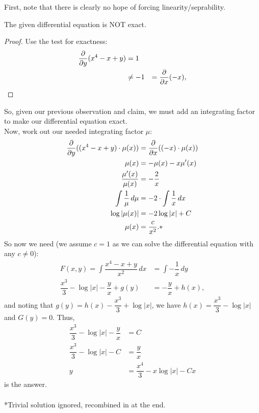 \documentclass{article}
\begin{document}
\begin{solution*}
    First, note that there is clearly no hope of forcing linearity/seprability.
    \begin{lemma}
        The given differential equation is NOT exact.
    \end{lemma}
    \begin{proof}
        Use the test for exactness:
        \begin{align*}
            \dfrac{\partial}{\partial y}(x^4 - x + y) &= 1 \\
            &\ne -1 &= \dfrac{\partial}{\partial x} (-x),
        \end{align*}
    \end{proof}
    So, given our previous observation and claim, we must add an integrating factor to make our differential equation exact. \\
    Now, work out our needed integrating factor $\mu$:
    \begin{align*}
        \dfrac{\partial}{\partial y}((x^4 - x + y) \cdot \mu(x)) &= \dfrac{\partial}{\partial x}((-x) \cdot \mu(x)) \\ 
        \mu(x) &= -\mu(x) - x \mu'(x) \\ 
        \dfrac{\mu'(x)}{\mu(x)} &= -\dfrac{2}{x} \\ 
        \int \dfrac{1}{\mu} \, d \mu &= -2 \cdot \int \dfrac{1}{x} \, dx \\ 
        \log |\mu(x)| &= -2\log |x| + C \\ 
        \mu(x) &= \dfrac{c}{x^2}.*
    \end{align*}
    So now we need (we assume $c=1$ as we can solve the differential equation with any $c \ne 0$):
    \begin{align*}
        F(x,y) = \int \dfrac{x^4 - x + y}{x^2} \, dx &= \int -\dfrac{1}{x} \, dy \\ 
        \dfrac{x^3}{3} - \log |x| - \dfrac{y}{x} + g(y) &= -\dfrac{y}{x} + h(x),
    \end{align*}
    and noting that $g(y) = h(x) - \dfrac{x^3}{3} + \log |x|$, we have $h(x) = \dfrac{x^3}{3} - \log |x|$ and $G(y) = 0$. Thus,
    \begin{align*}
        \dfrac{x^3}{3} - \log |x| - \dfrac{y}{x} &= C \\ 
        \dfrac{x^3}{3} - \log |x| - C &= \dfrac{y}{x} \\ 
        y &= \dfrac{x^4}{3} - x \log |x| - Cx
    \end{align*}
    is the answer.
    \\~\\ 
    *Trivial solution ignored, recombined in at the end.
\end{solution*}
\end{document}
